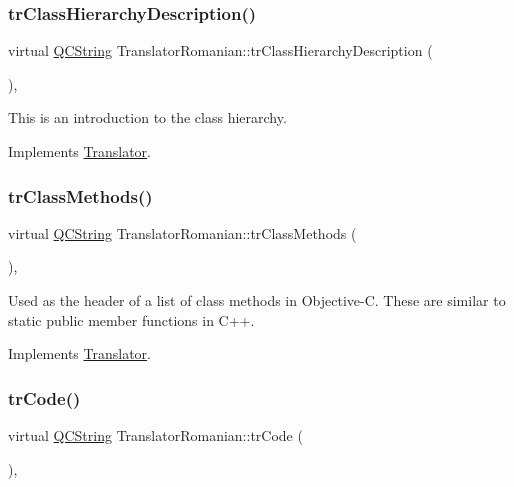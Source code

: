 \subsubsection{\texorpdfstring{trClassHierarchyDescription()}{trClassHierarchyDescription()}}
{\footnotesize\ttfamily virtual \mbox{\hyperlink{class_q_c_string}{Q\+C\+String}} Translator\+Romanian\+::tr\+Class\+Hierarchy\+Description (\begin{DoxyParamCaption}{ }\end{DoxyParamCaption})\hspace{0.3cm}{\ttfamily [inline]}, {\ttfamily [virtual]}}

This is an introduction to the class hierarchy. 

Implements \mbox{\hyperlink{class_translator}{Translator}}.

\mbox{\label{class_translator_romanian_ac4666444a7a161b9bdf78b9c0e773c87}} 
\subsubsection{\texorpdfstring{trClassMethods()}{trClassMethods()}}
{\footnotesize\ttfamily virtual \mbox{\hyperlink{class_q_c_string}{Q\+C\+String}} Translator\+Romanian\+::tr\+Class\+Methods (\begin{DoxyParamCaption}{ }\end{DoxyParamCaption})\hspace{0.3cm}{\ttfamily [inline]}, {\ttfamily [virtual]}}

Used as the header of a list of class methods in Objective-\/C. These are similar to static public member functions in C++. 

Implements \mbox{\hyperlink{class_translator}{Translator}}.

\mbox{\label{class_translator_romanian_af7226e162399a3ec1eeb47e434f25255}} 
\subsubsection{\texorpdfstring{trCode()}{trCode()}}
{\footnotesize\ttfamily virtual \mbox{\hyperlink{class_q_c_string}{Q\+C\+String}} Translator\+Romanian\+::tr\+Code (\begin{DoxyParamCaption}{ }\end{DoxyParamCaption})\hspace{0.3cm}{\ttfamily [inline]}, {\ttfamily [virtual]}}

